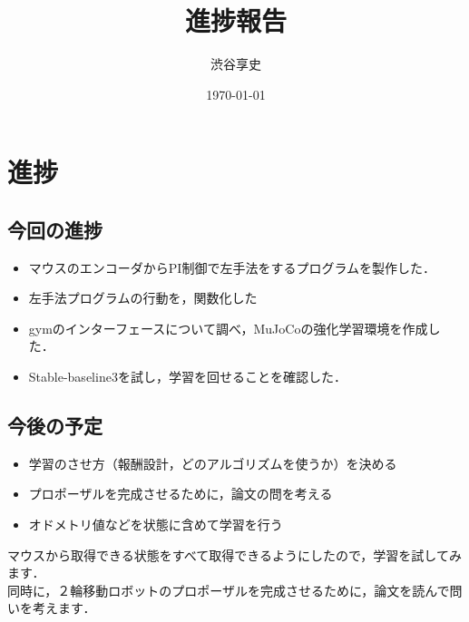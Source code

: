 \documentclass[a4paper,11pt]{jsarticle}
\begin{document}
\title{進捗報告}
\author{渋谷享史}
\date{\today}
\maketitle
\section{進捗}
\subsection{今回の進捗}
\begin{itemize}
  \item マウスのエンコーダからPI制御で左手法をするプログラムを製作した．
  \item 左手法プログラムの行動を，関数化した
  \item gymのインターフェースについて調べ，MuJoCoの強化学習環境を作成した．
  \item Stable-baseline3を試し，学習を回せることを確認した．
\end{itemize}
\subsection{今後の予定}
\begin{itemize}
  \item 学習のさせ方（報酬設計，どのアルゴリズムを使うか）を決める
  \item プロポーザルを完成させるために，論文の問を考える
  \item オドメトリ値などを状態に含めて学習を行う
\end{itemize}
マウスから取得できる状態をすべて取得できるようにしたので，学習を試してみます．\\
同時に，２輪移動ロボットのプロポーザルを完成させるために，論文を読んで問いを考えます．
\end{document}
